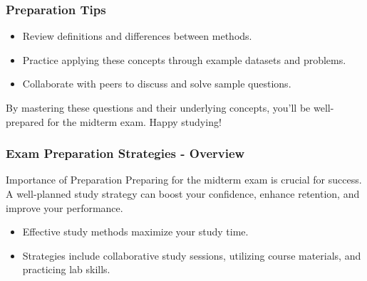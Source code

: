 \documentclass{beamer}
\begin{document}
\begin{frame}[fragile]
    \frametitle{Preparation Tips}
    \begin{itemize}
        \item Review definitions and differences between methods.
        \item Practice applying these concepts through example datasets and problems.
        \item Collaborate with peers to discuss and solve sample questions.
    \end{itemize}

    By mastering these questions and their underlying concepts, you'll be well-prepared for the midterm exam. Happy studying!
\end{frame}

\begin{frame}[fragile]
    \frametitle{Exam Preparation Strategies - Overview}
    \begin{block}{Importance of Preparation}
        Preparing for the midterm exam is crucial for success. A well-planned study strategy can boost your confidence, enhance retention, and improve your performance.
    \end{block}
    \begin{itemize}
        \item Effective study methods maximize your study time.
        \item Strategies include collaborative study sessions, utilizing course materials, and practicing lab skills.
    \end{itemize}
\end{frame}
\end{document}
